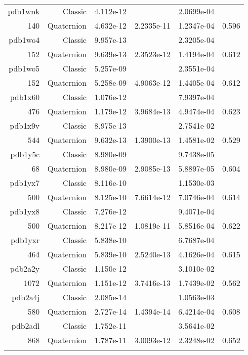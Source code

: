 \begin{xltabular}{\textwidth}{r|rS[table-format=1.3e+2]S[table-format=1.4e+2]S[table-format=1.4e+2]S[table-format=-1.3]}
pdb1wnk & Classic & 4.112e-12 &  & 2.0699e-04 & \\
140 & Quaternion & 4.632e-12 & 2.2335e-11 & 1.2347e-04 & 0.596\\  \addlinespace
pdb1wo4 & Classic & 9.957e-13 &  & 2.3205e-04 & \\
152 & Quaternion & 9.639e-13 & 2.3523e-12 & 1.4194e-04 & 0.612\\  \addlinespace
pdb1wo5 & Classic & 5.257e-09 &  & 2.3551e-04 & \\
152 & Quaternion & 5.258e-09 & 4.9063e-12 & 1.4405e-04 & 0.612\\  \addlinespace
pdb1x60 & Classic & 1.076e-12 &  & 7.9397e-04 & \\
476 & Quaternion & 1.179e-12 & 3.9684e-13 & 4.9474e-04 & 0.623\\  \addlinespace
{\color{red} pdb1x9v } & Classic & 8.975e-13 &  & 2.7541e-02 & \\
544 & Quaternion & 9.632e-13 & 1.3900e-13 & 1.4581e-02 & 0.529\\  \addlinespace
pdb1y5c & Classic & 8.980e-09 &  & 9.7438e-05 & \\
68 & Quaternion & 8.980e-09 & 2.9085e-13 & 5.8897e-05 & 0.604\\  \addlinespace
pdb1yx7 & Classic & 8.116e-10 &  & 1.1530e-03 & \\
500 & Quaternion & 8.125e-10 & 7.6614e-12 & 7.0746e-04 & 0.614\\  \addlinespace
pdb1yx8 & Classic & 7.276e-12 &  & 9.4071e-04 & \\
500 & Quaternion & 8.217e-12 & 1.0819e-11 & 5.8516e-04 & 0.622\\  \addlinespace
pdb1yxr & Classic & 5.838e-10 &  & 6.7687e-04 & \\
464 & Quaternion & 5.839e-10 & 2.5240e-13 & 4.1626e-04 & 0.615\\  \addlinespace
{\color{red} pdb2a2y } & Classic & 1.150e-12 &  & 3.1010e-02 & \\
1072 & Quaternion & 1.151e-12 & 3.7416e-13 & 1.7439e-02 & 0.562\\  \addlinespace
pdb2a4j & Classic & 2.085e-14 &  & 1.0563e-03 & \\
580 & Quaternion & 2.727e-14 & 1.4394e-14 & 6.4214e-04 & 0.608\\  \addlinespace
pdb2adl & Classic & 1.752e-11 &  & 3.5641e-02 & \\
868 & Quaternion & 1.787e-11 & 3.0093e-12 & 2.3248e-02 & 0.652\\  \addlinespace

\end{xltabular}
